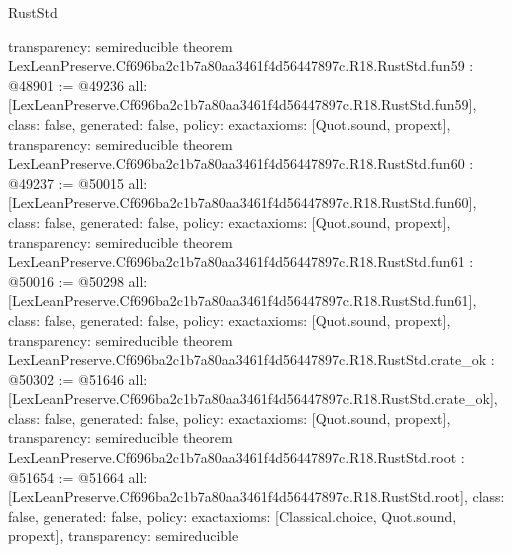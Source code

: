 \begin{lexlean}{RustStd}
\begin{coremodule}
{  transparency: semireducible
}
theorem LexLeanPreserve.Cf696ba2c1b7a80aa3461f4d56447897c.R18.RustStd.fun59 : @48901 := @49236 {
  all: [LexLeanPreserve.Cf696ba2c1b7a80aa3461f4d56447897c.R18.RustStd.fun59],
  class: false,
  generated: false,
  policy: exact{axioms: [Quot.sound, propext]},
  transparency: semireducible
}
theorem LexLeanPreserve.Cf696ba2c1b7a80aa3461f4d56447897c.R18.RustStd.fun60 : @49237 := @50015 {
  all: [LexLeanPreserve.Cf696ba2c1b7a80aa3461f4d56447897c.R18.RustStd.fun60],
  class: false,
  generated: false,
  policy: exact{axioms: [Quot.sound, propext]},
  transparency: semireducible
}
theorem LexLeanPreserve.Cf696ba2c1b7a80aa3461f4d56447897c.R18.RustStd.fun61 : @50016 := @50298 {
  all: [LexLeanPreserve.Cf696ba2c1b7a80aa3461f4d56447897c.R18.RustStd.fun61],
  class: false,
  generated: false,
  policy: exact{axioms: [Quot.sound, propext]},
  transparency: semireducible
}
theorem LexLeanPreserve.Cf696ba2c1b7a80aa3461f4d56447897c.R18.RustStd.crate_ok : @50302 := @51646 {
  all: [LexLeanPreserve.Cf696ba2c1b7a80aa3461f4d56447897c.R18.RustStd.crate_ok],
  class: false,
  generated: false,
  policy: exact{axioms: [Quot.sound, propext]},
  transparency: semireducible
}
theorem LexLeanPreserve.Cf696ba2c1b7a80aa3461f4d56447897c.R18.RustStd.root : @51654 := @51664 {
  all: [LexLeanPreserve.Cf696ba2c1b7a80aa3461f4d56447897c.R18.RustStd.root],
  class: false,
  generated: false,
  policy: exact{axioms: [Classical.choice, Quot.sound, propext]},
  transparency: semireducible
}


\end{coremodule}
\end{lexlean}
